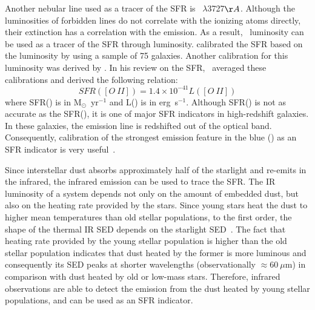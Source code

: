 Another nebular line used as a tracer of the SFR is \oii~$\lambda$3727$\AA$. 
Although the luminosities of forbidden lines do not correlate with the ionizing atoms directly, their extinction has a correlation with the \halpha emission. 
As a result, \oii~luminosity can be used as a tracer of the SFR through \halpha luminosity. 
\cite{Gallagher89} calibrated the SFR based on the \oii luminosity by using a sample of 75 galaxies. 
Another calibration for this luminosity was derived by \cite{Kennicutt92}. 
In his review on the SFR,~\citep{Kennicutt98b} averaged these calibrations and derived the following relation:
\begin{equation}
SFR([O\ II]) = 1.4 \times 10^{-41} L([O\ II])
\end{equation}  
where SFR(\oii) is in M$_{\odot}$~yr$^{-1}$ and L(\oii) is in erg~s$^{-1}$.
Although SFR(\oii) is not as accurate as the SFR(\halpha), it is one of major SFR indicators in high-redshift galaxies.
In these galaxies, the \halpha emission line is redshifted out of the optical band.
Consequently, calibration of the strongest emission feature in the blue (\oii) as an SFR indicator is very useful~\citep{Kennicutt98b}.


Since interstellar dust absorbs approximately half of the starlight and re-emits in the infrared, the infrared emission can be used to trace the SFR.
The IR luminosity of a system depends not only on the amount of embedded dust, but also on the heating rate provided by the stars. 
Since young stars heat the dust to higher mean temperatures than old stellar populations, to the first order, the shape of the thermal IR SED depends on the starlight SED~\citep{Helou86}.
The fact that heating rate provided by the young stellar population is higher than the old stellar population indicates that dust heated by the former is more luminous and consequently its SED peaks at shorter wavelengths (observationally $\approx 60~\mu$m) in comparison with dust heated by old or low-mass stars.
Therefore, infrared observations are able to detect the emission from the dust heated by young stellar populations, and can be used as an SFR indicator.  

